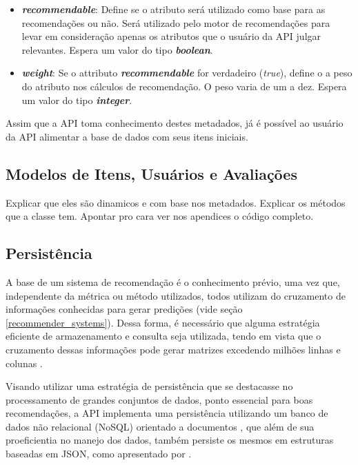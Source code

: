 \documentclass[12pt, openright, oneside, a4paper, brazil]{abntex2}
\begin{document}
\begin{itemize}
	\item \textbf{\textit{recommendable}}: Define se o atributo será utilizado como base para as recomendações ou não. Será utilizado pelo motor de recomendações para levar em consideração apenas os atributos que o usuário da API julgar relevantes. Espera um valor do tipo \textbf{\textit{boolean}}.

	\item \textbf{\textit{weight}}: Se o attributo \textbf{\textit{recommendable}} for verdadeiro (\textit{true}), define o a peso do atributo nos cálculos de recomendação. O peso varia de um a dez. Espera um valor do tipo \textbf{\textit{integer}}.
\end{itemize}

Assim que a API toma conhecimento destes metadados, já é possível ao usuário da API alimentar a base de dados com seus itens iniciais.

\subsection{Modelos de Itens, Usuários e Avaliações} \label{analisador:modelos}

Explicar que eles são dinamicos e com base nos metadados. Explicar os métodos que a classe tem. Apontar pro cara ver nos apendices o código completo.

\subsection{Persistência} \label{analisador:persistencia}

A base de um sistema de recomendação é o conhecimento prévio, uma vez que, independente da métrica ou método utilizados, todos utilizam do cruzamento de informações conhecidas para gerar predições (vide seção \ref{recommender_systems}). Dessa forma, é necessário que alguma estratégia eficiente de armazenamento e consulta seja utilizada, tendo em vista que o cruzamento dessas informações pode gerar matrizes excedendo milhões linhas e colunas \cite{gomez2016netflix}.

Visando utilizar uma estratégia de persistência que se destacasse no processamento de grandes conjuntos de dados, ponto essencial para boas recomendações, a API implementa uma persistência utilizando um banco de dados não relacional (NoSQL) orientado a documentos \cite{leavitt2010will}, que além de sua proeficientia no manejo dos dados, também persiste os mesmos em estruturas baseadas em JSON, como apresentado por .
\end{document}
